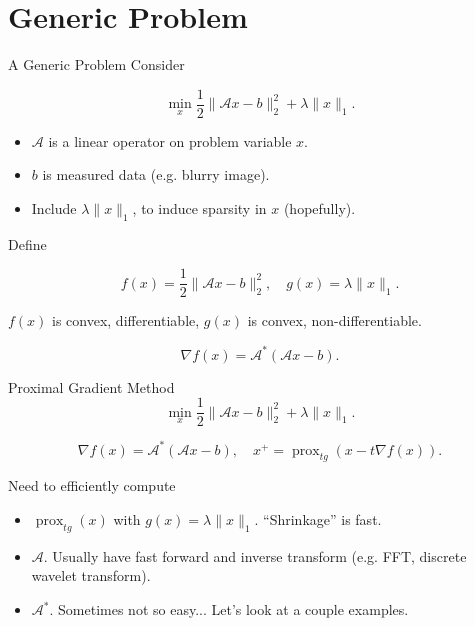 \documentclass[xcolor=dvipsnames,t]{beamer} %
\begin{document}
\section{Generic Problem}
\begin{frame}{A Generic Problem}
   Consider

   \[ \min_x \dfrac{1}{2}\|\mathcal{A}x-b\|_2^2 + \lambda \|x\|_1. \] 

   \begin{itemize}
      \item $\mathcal{A}$ is a linear operator on problem variable $x$.
      \item $b$ is measured data (e.g. blurry image).
      \item Include $\lambda \|x\|_1$, to induce sparsity in $x$ (hopefully).
   \end{itemize}

   Define 

   \[ f(x) = \dfrac{1}{2}\|\mathcal{A}x-b\|_2^2, \quad g(x) = \lambda \|x\|_1. \] 

   \noindent $f(x)$ is convex, differentiable, $g(x)$ is convex, non-differentiable.
   
   \[ \nabla f(x) = \mathcal{A}^\ast\left(\mathcal{A}x-b\right). \] 

\end{frame}

\begin{frame}{Proximal Gradient Method}
   \[ \min_x \dfrac{1}{2}\|\mathcal{A}x-b\|_2^2 + \lambda \|x\|_1. \] 

   \[ \nabla f(x) = \mathcal{A}^\ast\left(\mathcal{A}x-b\right), \quad x^{+} = \operatorname{prox}_{t g}\left(x - t\nabla f(x)\right). \] 

   \noindent Need to efficiently compute
   \begin{itemize}
      \item $\operatorname{prox}_{tg}(x)$ with $g(x) = \lambda \|x\|_1$.  ``Shrinkage'' is fast.
      \item $\mathcal{A}$.  Usually have fast forward and inverse transform (e.g. FFT, discrete wavelet transform).
      \item $\mathcal{A}^\ast$.  Sometimes not so easy...  Let's look at a couple examples.
   \end{itemize}
\end{frame}

\end{document}
